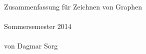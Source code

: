 \begin{titlepage}
	\phantom{text}\vfill
	\begin{center}
		\Huge{Zusammenfassung für Zeichnen von Graphen}\\\ \\
		\Large{Sommersemester 2014}\\\ \\
		\large{von Dagmar Sorg}
	\end{center}
	\vfill	\phantom{text}
	\end{titlepage}
